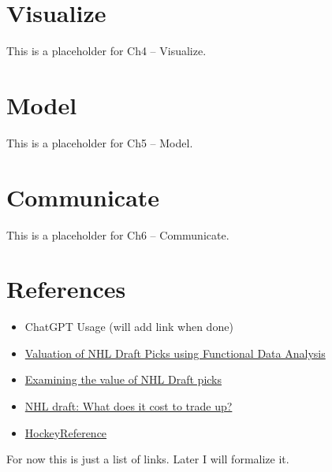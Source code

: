 \documentclass[
  letterpaper,
  DIV=11,
  numbers=noendperiod]{scrreprt}
\newlength{\cslhangindent}
\newenvironment{CSLReferences}[2] %
 {\begin{list}{}{%
  \setlength{\itemindent}{0pt}
  \setlength{\leftmargin}{0pt}
  \setlength{\parsep}{0pt}
  \ifodd #1
   \setlength{\leftmargin}{\cslhangindent}
   \setlength{\itemindent}{-1\cslhangindent}
  \fi
  \setlength{\itemsep}{#2\baselineskip}}}
 {\end{list}}
\begin{document}
\chapter{Visualize}\label{visualize}

This is a placeholder for Ch4 -- Visualize.


\chapter{Model}\label{model}

This is a placeholder for Ch5 -- Model.


\chapter{Communicate}\label{communicate}

This is a placeholder for Ch6 -- Communicate.


\chapter*{References}\label{references}


\label{refs}
\begin{CSLReferences}{0}{1}
\begin{itemize}
\item
  ChatGPT Usage (will add link when done)
\item
  \href{https://summit.sfu.ca/_flysystem/fedora/2023-02/etd22223.pdf}{Valuation
  of NHL Draft Picks using Functional Data Analysis}
\item
  \href{https://soundofhockey.com/2022/06/06/examining-the-value-of-nhl-draft-picks/amp/}{Examining
  the value of NHL Draft picks}
\item
  \href{https://www.broadstreethockey.com/post/nhl-draft-pick-value-trading-up/}{NHL
  draft: What does it cost to trade up?}
\item
  \href{https://www.hockey-reference.com/draft/}{HockeyReference}
\end{itemize}

\end{CSLReferences}

For now this is just a list of links. Later I will formalize it.
\end{document}

